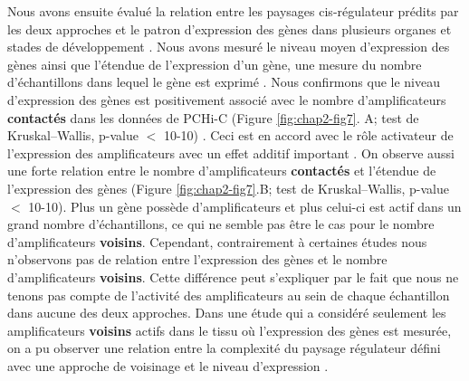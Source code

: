 Nous avons ensuite évalué la relation entre les paysages \gls{cis}-régulateur prédits par les deux approches et le patron d’expression des gènes dans plusieurs organes et stades de développement \citep{cardoso-moreira_gene_2019}. Nous avons mesuré le niveau moyen d’expression des gènes ainsi que l’étendue de l’expression d’un gène, une mesure du nombre d'échantillons dans lequel le gène est exprimé \citep{laverre_long-range_2022}. Nous confirmons que le niveau d’expression des gènes est positivement associé avec le nombre d’\glspl{amplificateur} \textbf{contactés} dans les données de \gls{PCHi-C} (Figure \ref{fig:chap2-fig7}. A; test de Kruskal–Wallis, p-value $<$ 10-10) \citep{javierre_lineage-specific_2016}. Ceci est en accord avec le rôle activateur de l’expression des \glspl{amplificateur} avec un effet additif important \citep{schoenfelder_pluripotent_2015, mifsud_mapping_2015}. On observe aussi une forte relation entre le nombre d’\glspl{amplificateur} \textbf{contactés} et l’étendue de l’expression des gènes (Figure \ref{fig:chap2-fig7}.B; test de Kruskal–Wallis, p-value $<$ 10-10). Plus un gène possède d’\glspl{amplificateur} et plus celui-ci est actif dans un grand nombre d'échantillons, ce qui ne semble pas être le cas pour le nombre d’\glspl{amplificateur} \textbf{voisins}. Cependant, contrairement à certaines études nous n’observons pas de relation entre l’expression des gènes et le nombre d’\glspl{amplificateur} \textbf{voisins}. Cette différence peut s’expliquer par le fait que nous ne tenons pas compte de l’activité des \glspl{amplificateur} au sein de chaque échantillon dans aucune des deux approches. Dans une étude qui a considéré seulement les \glspl{amplificateur} \textbf{voisins} actifs dans le tissu où l’expression des gènes est mesurée, on a pu observer une relation entre la complexité du paysage régulateur défini avec une approche de voisinage et le niveau d’expression \citep{berthelot_complexity_2018}.\\

